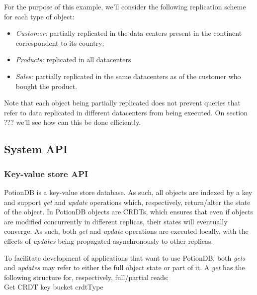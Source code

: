 \documentclass{vldb}
\begin{document}
For the purpose of this example, we'll consider the following replication scheme for each type of object:
\begin{itemize}
	\item \emph{Customer:} partially replicated in the data centers present in the continent correspondent to its country;
	\item \emph{Products:} replicated in all datacenters
	\item \emph{Sales:} partially replicated in the same datacenters as of the customer who bought the product. 
\end{itemize}

Note that each object being partially replicated does not prevent queries that refer to data replicated in different datacenters from being executed.
On section ??? %
we'll see how can this be done efficiently.

\subsection{System API}

\subsubsection{Key-value store API}

PotionDB is a key-value store database. %
As such, all objects are indexed by a key and support  \emph{get} and \emph{update} operations which, respectively, return/alter the state of the object.
In PotionDB objects are CRDTs, %
which ensures that even if objects are modified concurrently in different replicas, their states will eventually converge.
As such, both \emph{get} and \emph{update} operations are executed locally, with the effects of \emph{updates} being propagated asynchronously to other replicas.

To facilitate development of applications that want to use PotionDB, both \emph{gets} and \emph{updates} may refer to either the full object state or part of it.
A \emph{get} has the following structure for, respectively, full/partial reads: \\

Get CRDT key bucket crdtType 
\end{document}
